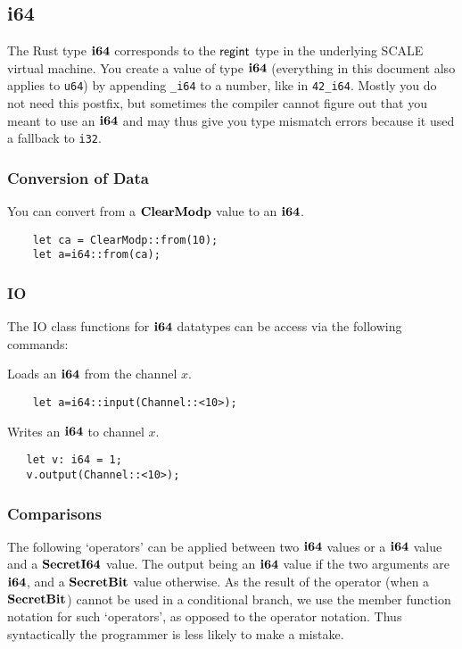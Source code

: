 \subsection{i64}
The Rust type $\mathbf{i64}$ corresponds to the $\mathsf{regint}$ type in the underlying SCALE virtual machine.
You create a value of type $\mathbf{i64}$ (everything in this document also applies to \verb|u64|)
by appending \verb|_i64| to a number, like in \verb|42_i64|. Mostly you
do not need this postfix, but sometimes the compiler cannot figure out that you meant to use an
$\mathbf{i64}$ and may thus give you type mismatch errors because it used a fallback to \verb|i32|.

\subsubsection{Conversion of Data}
You can convert from a $\mathbf{ClearModp}$ value to an $\mathbf{i64}$.
\begin{lstlisting}
    let ca = ClearModp::from(10);
    let a=i64::from(ca);
\end{lstlisting}

\subsubsection{IO}
The IO class functions for $\mathbf{i64}$ datatypes can be access via the following commands:

Loads an $\mathbf{i64}$ from the channel $x$.
\begin{lstlisting}
    let a=i64::input(Channel::<10>);
\end{lstlisting}

Writes an $\mathbf{i64}$ to channel $x$.
\begin{lstlisting}
   let v: i64 = 1;
   v.output(Channel::<10>);
\end{lstlisting}

\subsubsection{Comparisons}
The following `operators' can be applied between two $\mathbf{i64}$ values
or a $\mathbf{i64}$ value and a $\mathbf{SecretI64}$ value. The output being an $\mathbf{i64}$
value if the two arguments are $\mathbf{i64}$, and a $\mathbf{SecretBit}$ value otherwise.
As the result of the operator (when a $\mathbf{SecretBit}$) cannot be used in a
conditional branch, we use the member function notation for such `operators', as opposed
to the operator notation. Thus syntactically the programmer is less
likely to make a mistake.

